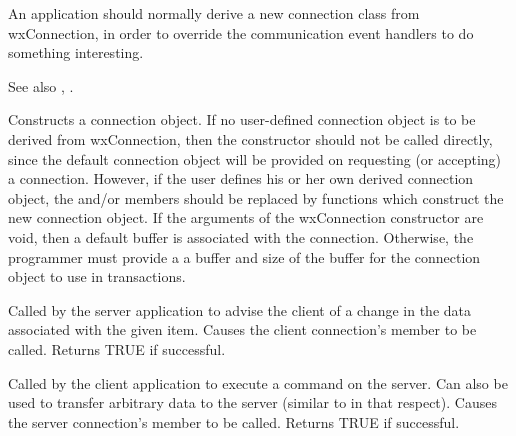 An application should normally derive a new connection class from
wxConnection, in order to override the communication event handlers
to do something interesting.

See also , .




Constructs a connection object. If no user-defined connection object is
to be derived from wxConnection, then the constructor should not be
called directly, since the default connection object will be provided on
requesting (or accepting) a connection. However, if the user defines his
or her own derived connection object, the \rtfsp
and/or  members should be replaced by
functions which construct the new connection object. If the arguments of
the wxConnection constructor are void, then a default buffer is
associated with the connection. Otherwise, the programmer must provide a
a buffer and size of the buffer for the connection object to use in
transactions.



Called by the server application to advise the client of a change in
the data associated with the given item. Causes the client
connection's 
member to be called. Returns TRUE if successful.



Called by the client application to execute a command on the server. Can
also be used to transfer arbitrary data to the server (similar
to  in that respect). Causes the
server connection's  member to be
called. Returns TRUE if successful.



